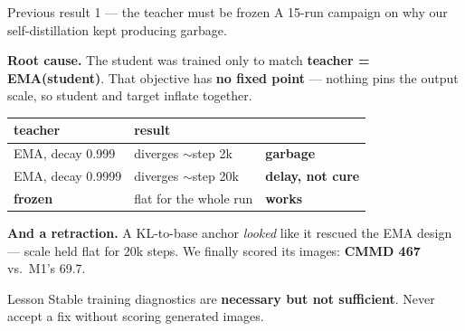 \documentclass[10pt,aspectratio=169]{beamer}
\newcommand{\good}[1]{\textcolor{good}{\textbf{#1}}}
\newcommand{\bad}[1]{\textcolor{bad}{\textbf{#1}}}
\begin{document}
\begin{frame}{Previous result 1 --- the teacher must be frozen}
  A 15-run campaign on why our self-distillation kept producing garbage.

  \vspace{0.8em}
  \textbf{Root cause.} The student was trained only to match \textbf{teacher = EMA(student)}.
  That objective has \textbf{no fixed point} --- nothing pins the output scale, so student
  and target inflate together.

  \vspace{0.8em}
  \begin{center}
  \begin{tabular}{lll}
    \toprule
    teacher & result & \\
    \midrule
    EMA, decay 0.999   & diverges $\sim$step 2k   & \bad{garbage} \\
    EMA, decay 0.9999  & diverges $\sim$step 20k  & \bad{delay, not cure} \\
    \textbf{frozen}    & flat for the whole run   & \good{works} \\
    \bottomrule
  \end{tabular}
  \end{center}

  \vspace{0.8em}
  \textbf{And a retraction.} A KL-to-base anchor \emph{looked} like it rescued the EMA
  design --- scale held flat for 20k steps. We finally scored its images:
  \bad{CMMD 467} vs.\ M1's 69.7.

  \begin{alertblock}{Lesson}
    Stable training diagnostics are \textbf{necessary but not sufficient}.
    Never accept a fix without scoring generated images.
  \end{alertblock}
\end{frame}
\end{document}
